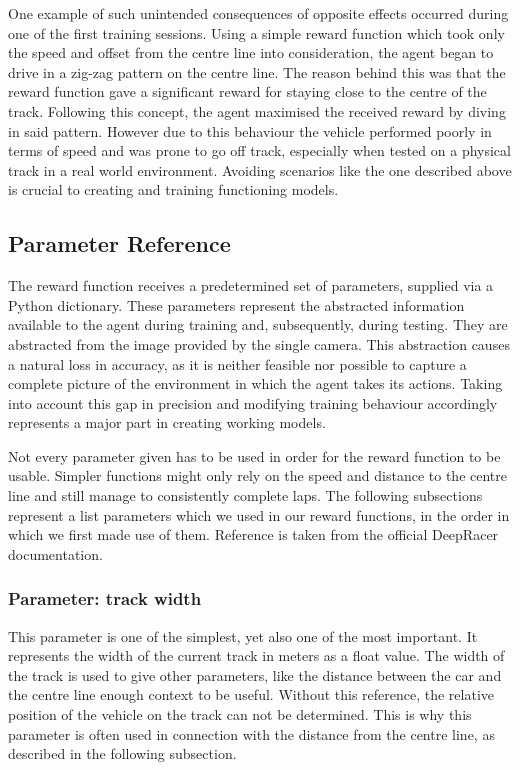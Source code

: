 One example of such unintended consequences of opposite effects occurred during one of the first training sessions. Using a simple reward function which took only the speed and offset from the centre line into consideration, the agent began to drive in a zig-zag pattern on the centre line. The reason behind this was that the reward function gave a significant reward for staying close to the centre of the track. Following this concept, the agent maximised the received reward by diving in said pattern. However due to this behaviour the vehicle performed poorly in terms of speed and was prone to go off track, especially when tested on a physical track in a real world environment. Avoiding scenarios like the one described above is crucial to creating and training functioning models.

\subsection{Parameter Reference}
The reward function receives a predetermined set of parameters, supplied via a Python dictionary. These parameters represent the abstracted information available to the agent during  training and, subsequently, during testing. They are abstracted from the image provided by the single camera. This abstraction causes a natural loss in accuracy, as it is neither feasible nor possible to capture a complete picture of the environment in which the agent takes its actions. Taking into account this gap in precision and modifying training behaviour accordingly  represents a major part in creating working models.

Not every parameter given has to be used in order for the reward function to be usable. Simpler functions might only rely on the speed and distance to the centre line and still manage to consistently complete laps. The following subsections represent a list parameters which we used in our reward functions, in the order in which we first made use of them. Reference is taken from the official DeepRacer documentation.

\subsubsection{Parameter: track width}
This parameter is one of the simplest, yet also one of the most important. It represents the width of the current track in meters as a float value. The width of the track is used to give other parameters, like the distance between the car and the centre line enough context to be useful. Without this reference, the relative position of the vehicle on the track can not be determined. This is why this parameter is often used in connection with the distance from the centre line, as described in the following subsection.

